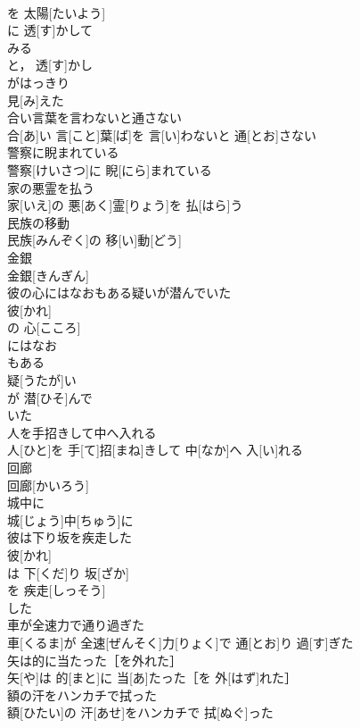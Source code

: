\documentclass[8pt]{extreport}
\begin{document}
\begin{CJK}{UTF8}{min}
\\	を 太陽[たいよう]
\\	に 透[す]かして 
\\	みる 
\\	と， 透[す]かし 
\\	がはっきり 
\\	見[み]えた 
\\	合い言葉を言わないと通さない	
\\	合[あ]い 言[こと]葉[ば]を 言[い]わないと 通[とお]さない
\\	警察に睨まれている	
\\	警察[けいさつ]に 睨[にら]まれている
\\	家の悪霊を払う	
\\	家[いえ]の 悪[あく]霊[りょう]を 払[はら]う
\\	民族の移動	
\\	民族[みんぞく]の 移[い]動[どう]
\\	金銀	
\\	金銀[きんぎん]
\\	彼の心にはなおもある疑いが潜んでいた	
\\	彼[かれ]
\\	の 心[こころ]
\\	にはなお 
\\	もある 
\\	疑[うたが]い 
\\	が 潜[ひそ]んで 
\\	いた
\\	人を手招きして中へ入れる	
\\	人[ひと]を 手[て]招[まね]きして 中[なか]へ 入[い]れる
\\	回廊	
\\	回廊[かいろう]
\\	城中に	
\\	城[じょう]中[ちゅう]に
\\	彼は下り坂を疾走した	
\\	彼[かれ]
\\	は 下[くだ]り 坂[ざか]
\\	を 疾走[しっそう]
\\	した 
\\	車が全速力で通り過ぎた	
\\	車[くるま]が 全速[ぜんそく]力[りょく]で 通[とお]り 過[す]ぎた
\\	矢は的に当たった［を外れた］	
\\	矢[や]は 的[まと]に 当[あ]たった［を 外[はず]れた］
\\	額の汗をハンカチで拭った	
\\	額[ひたい]の 汗[あせ]をハンカチで 拭[ぬぐ]った

\end{CJK}
\end{document}
